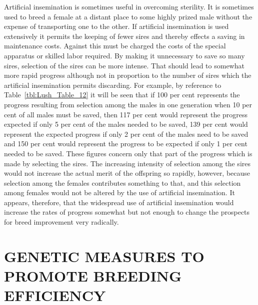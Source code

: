 Artificial insemination is sometimes useful
in overcoming sterility.
It is sometimes used to breed a female at a distant place to some highly
prized male without the expense of transporting one to the other. If
artificial insemination is used extensively it permits the keeping of fewer
sires and thereby effects a saving in maintenance costs. Against this
must be charged the costs of the special apparatus or skilled labor
required. By making it unnecessary to save so many sires, selection of
the sires can be more intense. That should lead to somewhat more rapid
progress although not in proportion to the number of sires which
the artificial insemination permits discarding. For example, by reference
to Table~\ref{tbl:Lush_Table_12} it will be seen that if 100 per cent represents the progress
resulting from selection among the males in one generation when
10 per cent of all males must be saved, then 117 per cent would represent
the progress expected if only 5 per cent of the males needed to be
saved, 139 per cent would represent the expected progress if only 2 per
cent of the males need to be saved and 150 per cent would represent the
progress to be expected if only 1 per cent needed to be saved. These figures
concern only that part of the progress which is made by selecting
the sires. The increasing intensity of selection among the sires would
not increase the actual merit of the offspring so rapidly, however,
because selection among the females contributes something to that, and
this selection among females would not be altered by the use of artificial
insemination. It appears, therefore, that the widespread use of artificial
insemination would increase the rates of progress somewhat but not
enough to change the prospects for breed improvement very radically.

\section*{GENETIC MEASURES TO PROMOTE BREEDING EFFICIENCY}

